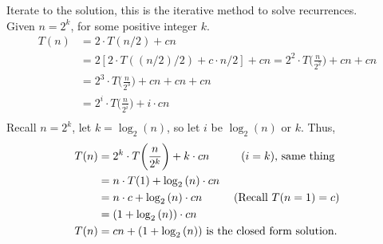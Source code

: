 \documentclass{article}
\begin{document}
Iterate to the solution, this is the iterative method to solve recurrences.\\
Given $n=2^k$, for some positive integer $k$.
\begin{equation*}
\begin{split}
  T(n) & = 2 \cdot T(n/2) + cn\\
  & = 2[2 \cdot T((n/2)/2) + c \cdot n/2] + cn = 2^2 \cdot T\bigg(\frac{n}{2^2}\bigg)+cn+cn\\
  & = 2^3 \cdot T\bigg(\frac{n}{2^3}\bigg)+cn+cn+cn\\
  & = 2^i \cdot T\bigg(\frac{n}{2^i}\bigg)+i \cdot cn\\
\end{split}
\end{equation*}
Recall $n=2^k$, let $k=\log_2{(n)}$, so let $i$ be $\log_2{(n)}$ or $k$. Thus,\\
\begin{equation*}
\begin{split}
  T(n) & = 2^k \cdot T\bigg(\frac{n}{2^k}\bigg) + k \cdot cn \text{\hspace{10mm}($i=k$), same thing}\\
  & = n \cdot T(1) + \log_2{(n)} \cdot cn\\
  & = n \cdot c + \log_2{(n)} \cdot cn \text{\hspace{10mm}(Recall $T(n=1) = c$)}\\
  & = (1 + \log_2{(n)}) \cdot cn\\
  T(n) & = cn + (1 + \log_2{(n)}) \text{ is the closed form solution.}
\end{split}
\end{equation*}
\end{document}
